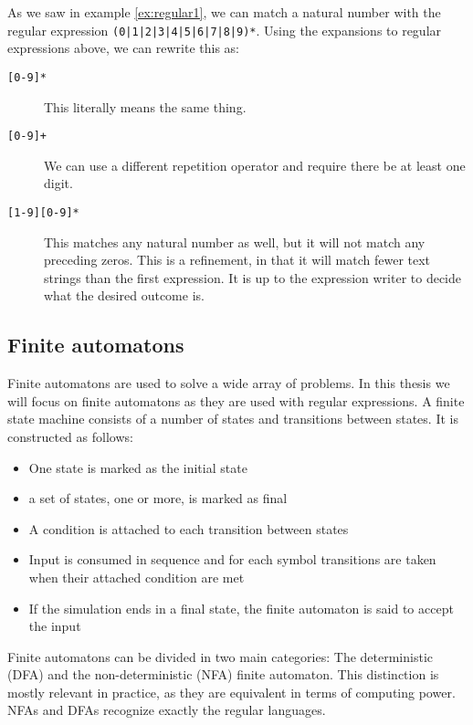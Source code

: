 \begin{example}

As we saw in example \ref{ex:regular1}, we can match a natural number
with the regular expression \texttt{(0|1|2|3|4|5|6|7|8|9)*}. Using the
expansions to regular expressions above, we can rewrite this as:
\begin{description}
\item[\texttt{[0-9]*}] This literally means the same thing.
\item[\texttt{[0-9]+}] We can use a different repetition operator and
  require there be at least one digit.
\item[\texttt{[1-9][0-9]*}] This matches any natural number as
  well, but it will not match any preceding zeros. This is a
  refinement, in that it will match fewer text strings than the first
  expression. It is up to the expression writer to decide what the desired outcome is.
\end{description}
\end{example}


\subsection{Finite automatons}

Finite automatons are used to solve a wide array of problems. In this
thesis we will focus on finite automatons as they are used with
regular expressions. 
A finite state machine consists of a number of
states and transitions between states. It is constructed as follows:
\begin{itemize}
    \item One state is marked as the
    initial state
    \item a set of states, one or more, is marked as final
    \item A condition is attached to each transition between states
    \item Input is consumed in sequence and for each symbol transitions are taken when their attached condition are met
    \item If the simulation ends in a final state, the finite automaton is said to accept the input
\end{itemize}

Finite automatons can be divided in two main categories: The
deterministic (DFA) and the non-deterministic (NFA) finite
automaton. This distinction is mostly relevant in practice, as they
are equivalent in terms of computing power. NFAs and DFAs recognize
exactly the regular languages.

